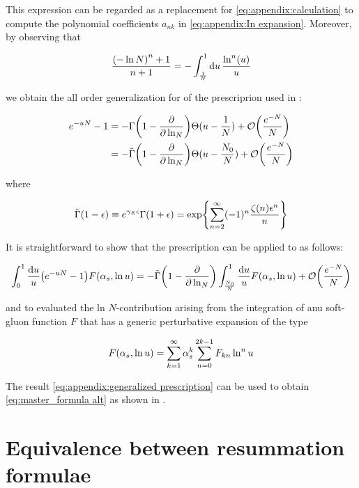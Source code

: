 \documentclass[../main.tex]{subfiles}
\begin{document}
This expression can be regarded as a replacement for \cref{eq:appendix:calculation} to compute the polynomial coefficients $a_{nk}$ 
in \cref{eq:appendix:In expansion}. Moreover, by observing that 

\begin{equation}
    \frac{ \qty(-\ln N)^n+1}{n+1} = -\int_{\frac{1}{N}}^1 \dd{u} \frac{\ln^n(u)}{u}
\end{equation}

we obtain the all order generalization for of the prescriprion used in \cite{CATANI19933}:

\begin{align}
    e^{-uN}-1 &= -\Gamma\qty(1-\pdv{\ln_N}) \Theta(u-\frac{1}{N}) + \order{\frac{e^{-N}}{N}}\\
              &=  -\tilde{\Gamma}\qty(1-\pdv{\ln_N}) \Theta(u-\frac{N_0}{N}) + \order{\frac{e^{-N}}{N}}
\end{align}

where 

\begin{equation}\label{eq:appendix:gamma tilde}
    \tilde{\Gamma}\qty(1-\epsilon) \equiv e^{\gamma_E \epsilon} \Gamma(1+\epsilon) = \exp{\sum_{n=2}^\infty (-1)^n \frac{ \zeta(n) \epsilon^n}{n}}
\end{equation}

It is straightforward to show that the prescription can be applied to as follows:

\begin{equation} \label{eq:appendix:generalized prescription}
    \int_0^1 \frac{\dd{u}}{u} \qty(e^{-u N} - 1) F\qty(\alpha_s , \ln u) = -\tilde{\Gamma}\qty(1-\pdv{\ln_N}) \int_{\frac{N_0}{N}}^1 \frac{\dd{u}}{u} F\qty(\alpha_s , \ln u) + \order{\frac{e^{-N}}{N}}
\end{equation}
    
and to evaluated the ln $N$-contribution arising from the integration of anu soft-gluon function $F$ that has a generic perturbative expansion of the type

\begin{equation}
    F\qty(\alpha_s , \ln u) = \sum_{k=1}^\infty \alpha_s^k \sum_{n=0}^{2k-1} F_{kn}\ln^n u
\end{equation}

The result \cref{eq:appendix:generalized prescription} can be used to obtain \cref{eq:master_formula alt} as shown in \cite{Catani_2003_appendix}.

\section{Equivalence between resummation formulae} \label{Appendix: Coefficients}
\end{document}
